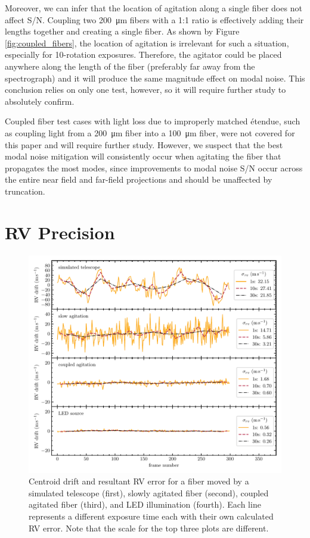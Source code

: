 Moreover, we can infer that the location of agitation along a single fiber does not affect S/N. Coupling two \SI{200}{\micro\meter} fibers with a 1:1 ratio is effectively adding their lengths together and creating a single fiber. As shown by Figure \ref{fig:coupled_fibers}, the location of agitation is irrelevant for such a situation, especially for 10-rotation exposures. Therefore, the agitator could be placed anywhere along the length of the fiber (preferably far away from the spectrograph) and it will produce the same magnitude effect on modal noise. This conclusion relies on only one test, however, so it will require further study to absolutely confirm.

Coupled fiber test cases with light loss due to improperly matched \'etendue, such as coupling light from a \SI{200}{\micro\meter} fiber into a \SI{100}{\micro\meter} fiber, were not covered for this paper and will require further study. However, we suspect that the best modal noise mitigation will consistently occur when agitating the fiber that propagates the most modes, since improvements to modal noise S/N occur across the entire near field and far-field projections and should be unaffected by truncation.

\section{RV Precision}
\label{modal-noise:rv-precision}

\begin{figure}
\centering
	\includegraphics[width=\textwidth]{figures-2/rv_error.pdf}
	\caption[Radial velocity error with and without fiber agitation]{Centroid drift and resultant RV error for a fiber moved by a simulated telescope (first), slowly agitated fiber (second), coupled agitated fiber (third), and LED illumination (fourth). Each line represents a different exposure time each with their own calculated RV error. Note that the scale for the top three plots are different.}
\label{fig:rv_error}
\end{figure}

